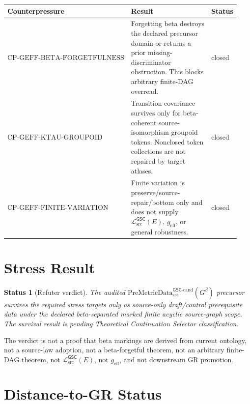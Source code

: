 \documentclass[11pt]{article}
\newcommand{\PreMetricData}{\mathrm{PreMetricData}_{\mathrm{src}}^{\mathsf{GSC}\mbox{-}\mathrm{cand}}}
\newcommand{\MetricData}{\mathcal{L}_{\mathrm{src}}^{\mathsf{GSC}}}
\newcommand{\Gbeta}{G^\beta}
\newcommand{\geff}{g_{\mathrm{eff}}}
\newtheorem{status}{Status}
\begin{document}
\begin{longtable}{p{0.24\linewidth}p{0.58\linewidth}p{0.12\linewidth}}
\toprule
Counterpressure & Result & Status \\
\midrule
\(\mathrm{CP\mbox{-}GEFF\mbox{-}BETA\mbox{-}FORGETFULNESS}\) &
Forgetting beta destroys the declared precursor domain or returns a prior
missing-discriminator obstruction. This blocks arbitrary finite-DAG overread. &
closed \\
\(\mathrm{CP\mbox{-}GEFF\mbox{-}KTAU\mbox{-}GROUPOID}\) &
Transition covariance survives only for beta-coherent source-isomorphism
groupoid tokens. Nonclosed token collections are not repaired by target
atlases. &
closed \\
\(\mathrm{CP\mbox{-}GEFF\mbox{-}FINITE\mbox{-}VARIATION}\) &
Finite variation is preserve/source-repair/bottom only and does not supply
\(\MetricData(E)\), \(\geff\), or general robustness. &
closed \\
\bottomrule
\end{longtable}

\section{Stress Result}

\begin{status}[Refuter verdict]
The audited \(\PreMetricData(\Gbeta)\) precursor survives the required stress
targets only as source-only draft/control prerequisite data under the declared
beta-separated marked finite acyclic source-graph scope. The survival result
is pending Theoretical Continuation Selector classification.
\end{status}

The verdict is not a proof that beta markings are derived from current
ontology, not a source-law adoption, not a beta-forgetful theorem, not an
arbitrary finite-DAG theorem, not \(\MetricData(E)\), not \(\geff\), and not
downstream GR promotion.

\section{Distance-to-GR Status}
\end{document}
